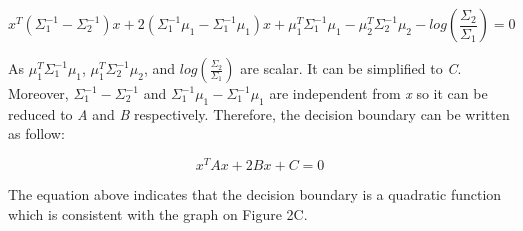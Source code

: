 \documentclass{article}
\begin{document}
$$
x^T(\Sigma _1^{-1} - \Sigma _2^{-1})x + 2(\Sigma _1^{-1}\mu_1 - \Sigma _1^{-1}\mu_1)x + \mu_1^T\Sigma _1^{-1}\mu_1 - \mu_2^T\Sigma _2^{-1}\mu_2 - log(\frac{\Sigma_2}{\Sigma_1}) = 0
$$

As $\mu_1^T\Sigma _1^{-1}\mu_1$, $\mu_1^T\Sigma _2^{-1}\mu_2$, and $log(\frac{\Sigma_2}{\Sigma_1})$ are scalar. It can be simplified to \textit{C}. Moreover, $\Sigma _1^{-1} - \Sigma _2^{-1}$ and $\Sigma _1^{-1}\mu_1 - \Sigma _1^{-1}\mu_1$ are independent from \textit{x} so it can be reduced to \textit{A} and \textit{B} respectively. Therefore, the decision boundary can be written as follow:

$$
x^TAx + 2Bx + C = 0
$$

The equation above indicates that the decision boundary is a quadratic function which is consistent with the graph on Figure 2C.
\end{document}
